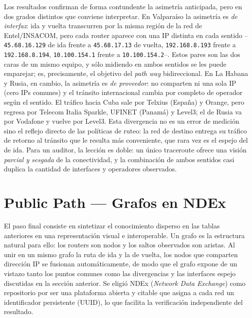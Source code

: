 \documentclass[11pt,a4paper]{article}
\newcommand{\ip}[1]{\texttt{#1}}
\begin{document}
Los resultados confirman de forma contundente la asimetría anticipada, pero en dos grados
distintos que conviene interpretar. En Valparaíso la asimetría es \emph{de interfaz}: ida y
vuelta transcurren por la misma región de la red de Entel/INSACOM, pero cada router aparece con
una IP distinta en cada sentido --\ip{45.68.16.129} de ida frente a \ip{45.68.17.13} de vuelta,
\ip{192.168.8.193} frente a \ip{192.168.8.194}, \ip{10.100.154.1} frente a \ip{10.100.154.2}--.
Estos pares son las dos caras de un mismo equipo, y sólo midiendo en ambos sentidos se les puede
emparejar; es, precisamente, el objetivo del \emph{path way} bidireccional. En La Habana y Rusia,
en cambio, la asimetría es \emph{de proveedor}: no comparten ni una sola IP (cero IPs comunes) y
el tránsito internacional cambia por completo de operador según el sentido. El tráfico hacia Cuba
sale por Telxius (España) y Orange, pero regresa por Telecom Italia Sparkle, UFINET (Panamá) y
Level3; el de Rusia va por Vodafone y vuelve por Level3. Esta divergencia no es un error de
medición sino el reflejo directo de las políticas de ruteo: la red de destino entrega su tráfico
de retorno al tránsito que le resulta más conveniente, que rara vez es el espejo del de ida. Para
un auditor, la lección es doble: un único traceroute ofrece una visión \emph{parcial y sesgada} de
la conectividad, y la combinación de ambos sentidos casi duplica la cantidad de interfaces y
operadores observados.

\section{Public Path --- Grafos en NDEx}
El paso final consiste en sintetizar el conocimiento disperso en las tablas anteriores en una
representación visual e interoperable. Un grafo es la estructura natural para ello: los routers
son nodos y los saltos observados son aristas. Al unir en un mismo grafo la ruta de ida y la de
vuelta, los nodos que comparten dirección IP se fusionan automáticamente, de modo que el grafo
expone de un vistazo tanto los puntos comunes como las divergencias y las interfaces espejo
discutidas en la sección anterior. Se eligió NDEx (\emph{Network Data Exchange}) como repositorio
por ser una plataforma abierta y citable que asigna a cada red un identificador persistente
(UUID), lo que facilita la verificación independiente del resultado.
\end{document}
